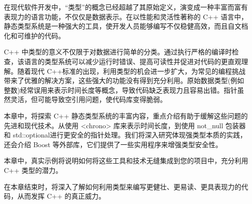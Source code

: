 在现代软件开发中，“类型”的概念已经超越了其原始定义，演变成一种丰富而富有表现力的语言功能，不仅仅是数据表示。在以性能和灵活性著称的 C++ 语言中，静态类型系统是一种强大的工具，使开发人员能够编写不仅稳健高效，而且自文档化和可维护的代码。

C++ 中类型的意义不仅限于对数据进行简单的分类。通过执行严格的编译时检查，该语言的类型系统可以减少运行时错误、提高可读性并促进对代码的更直观理解。随着现代 C++标准的出现，利用类型的机会进一步扩大，为常见的编程挑战带来了优雅的解决方案，这些强大的功能没有得到充分利用。原始数据类型(例如整数)经常误用来表示时间长度等概念，导致代码缺乏表现力且容易出错。指针虽然灵活，但可能导致空引用问题，使代码库变得脆弱。

本章中，将探索 C++ 静态类型系统的丰富内容，重点介绍有助于缓解这些问题的先进和现代技术。从使用 <chrono> 库来表示时间长度，到使用 not\_null 包装器和 std::optional进行更安全的指针处理。我们将深入研究体现强类型本质的实践，还会介绍 Boost 等外部库，它们提供了一些实用程序来增强类型安全性。

本章中，真实示例将说明如何将这些工具和技术无缝集成到您的项目中，充分利用 C++ 类型的潜力。

在本章结束时，将深入了解如何利用类型来编写更健壮、更易读、更具表现力的代码，从而发挥 C++ 的真正威力。
